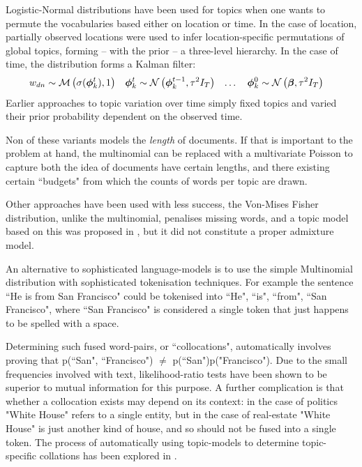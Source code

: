 Logistic-Normal distributions have been used for topics when one wants to permute the vocabularies based either on location \cite{Eisenstein2010} or time\cite{Blei2006a}. In the case of location, partially observed locations were used to infer location-specific permutations of global topics, forming -- with the prior -- a three-level hierarchy. In the case of time, the distribution forms a Kalman filter:
\begin{align}
w_{dn} & \sim \mathcal{M} \left( {\sigma(\bm \phi_k^t)},{1} \right) &
\bm \phi_k^t & \sim \mathcal{N} \left( {\bm \phi_k^{t-1}}, {\tau^2 I_T} \right) & \ldots\quad
\bm \phi_k^0 & \sim \mathcal{N} \left( {\bm \beta}, {\tau^2 I_T} \right)
\end{align}
Earlier approaches to topic variation over time simply fixed topics and varied their prior probability dependent on the observed time\cite{Wang2006}. 
 
Non of these variants models the \emph{length} of documents. If that is important to the problem at hand, the multinomial can be replaced with a multivariate Poisson\cite{Gopalan2013} to capture both the idea of documents have certain lengths, and there existing certain ``budgets" from which the counts of words per topic are drawn.  

Other approaches have been used with less success, the Von-Mises Fisher distribution, unlike the multinomial, penalises missing words, and a topic model based on this was proposed in \cite{Reisinger2010}, but it did not constitute a proper admixture model.

An alternative to sophisticated language-models is to use the simple Multinomial distribution with sophisticated tokenisation techniques. For example the sentence ``He is from San Francisco" could be tokenised into {``He", ``is", ``from", ``San Francisco"}, where ``San Francisco" is considered a single token that just happens to be spelled with a space.

Determining such fused word-pairs, or ``collocations", automatically  involves proving that p(``San", ``Francisco") $\neq$ p(``San")p("Francisco"). Due to the small frequencies involved with text, likelihood-ratio tests have been shown to be superior to mutual information for this purpose\cite{Dunning1993}. A further complication is that whether a collocation exists may depend on its context: in the case of politics "White House" refers to a single entity, but in the case of real-estate "White House" is just another kind of house, and so should not be fused into a single token. The process of automatically using topic-models to determine topic-specific collations has been explored in \cite{Johnson2010}.


